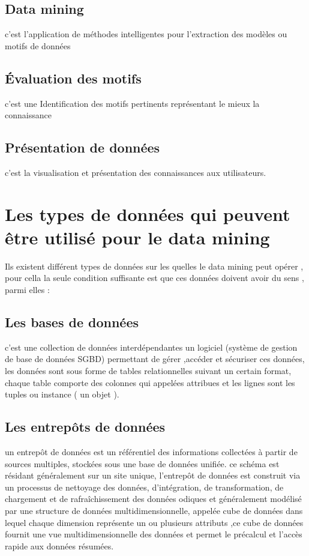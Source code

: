 \documentclass[12pt,a4paper,oneside]{book}
\begin{document}
\subsection{Data mining}
c'est l'application de méthodes intelligentes pour l'extraction des modèles ou motifs de données 
\subsection{Évaluation des motifs}
c'est une Identification des motifs pertinents représentant le mieux la connaissance

\subsection{Présentation de données}
c'est la visualisation et présentation des connaissances aux utilisateurs.
\section{Les types de données qui peuvent être utilisé pour le data mining }
Ils existent différent types de données sur les quelles le data mining peut opérer , pour cella la seule condition suffisante est que ces données doivent avoir du sens , parmi elles :
\subsection{Les bases de données}
c'est une collection de données interdépendantes  un logiciel  (système de gestion de base de données SGBD) permettant de gérer ,accéder et sécuriser ces données, les données sont sous forme de tables relationnelles  suivant un certain format, chaque table comporte des colonnes qui appelées attribues et les lignes sont les tuples  ou instance ( un objet ).


\subsection{Les entrepôts de données}

un entrepôt de données est un référentiel des informations collectées à partir de sources multiples, stockées sous une base de données unifiée.
ce schéma est résidant généralement sur un site unique, l'entrepôt de données est construit via un processus de nettoyage des données, d’intégration, de transformation, de chargement et de
rafraîchissement des données odiques et généralement modélisé par une structure de données multidimensionnelle, appelée
cube de données
dans lequel chaque
dimension représente un ou plusieurs attributs ,ce cube de données fournit une vue multidimensionnelle des données et permet
le précalcul et l'accès rapide aux données résumées.
\end{document}
